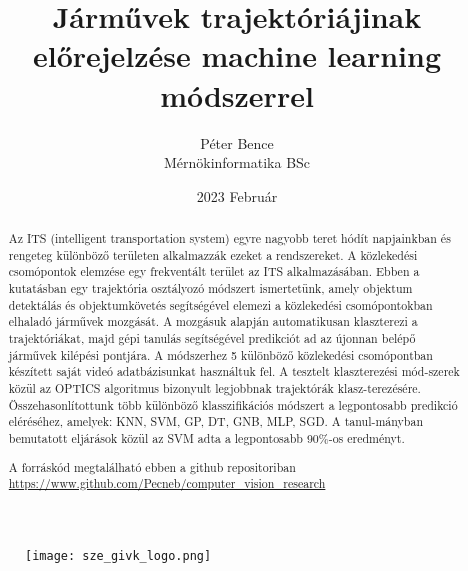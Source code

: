 \documentclass{article}
\title{Járművek trajektóriájinak előrejelzése machine learning módszerrel}
\author{Péter Bence\\Mérnökinformatika BSc}
\date{2023 Február}
\begin{document}
    
    \maketitle
    \begin{figure}[H]\centering
        \texttt{[image: sze\_givk\_logo.png]}
    \end{figure}
    \newpage
    \begin{abstract}
        Az ITS (intelligent transportation system) egyre nagyobb teret 
        hódít napjainkban és rengeteg különböző területen alkalmazzák 
        ezeket a rendszereket. A közlekedési csomópontok elemzése egy 
        frekventált terület az ITS alkalmazásában. Ebben a kutatásban 
        egy trajektória osztályozó módszert ismertetünk, amely objektum 
        detektálás és objektumkövetés segítségével elemezi a közlekedési 
        csomópontokban elhaladó járművek mozgását. A mozgásuk alapján 
        automatikusan klaszterezi a trajektóriákat, majd gépi tanulás 
        segítségével predikciót ad az újonnan belépő járművek kilépési 
        pontjára. A módszerhez 5 különböző közlekedési csomópontban 
        készített saját videó adatbázisunkat használtuk fel.
        A tesztelt klaszterezési mód-szerek közül az OPTICS algoritmus 
        bizonyult legjobbnak trajektórák klasz-terezésére.
        Összehasonlítottunk több különböző klasszifikációs módszert 
        a legpontosabb predikció eléréséhez, amelyek: KNN, SVM, GP, DT, 
        GNB, MLP, SGD. A tanul-mányban bemutatott eljárások közül az 
        SVM adta a legpontosabb 90\%-os eredményt.
        
        A forráskód megtalálható ebben a github repositoriban 
        \url{https://www.github.com/Pecneb/computer_vision_research}
        

\end{abstract}
\end{document}
